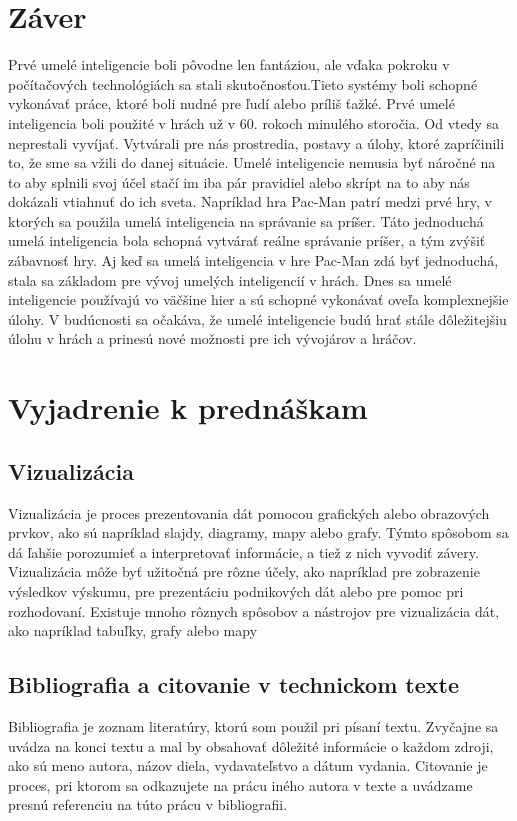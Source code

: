 \documentclass[10pt,oneside,slovak,a4paper]{article}
\begin{document}
\section{Záver}
Prvé umelé inteligencie boli pôvodne len fantáziou, ale vďaka pokroku v počítačových technológiách sa stali skutočnosťou.Tieto systémy boli schopné vykonávať práce, ktoré boli nudné pre ľudí alebo príliš ťažké.
Prvé umelé inteligencia boli použité v hrách už v 60. rokoch minulého storočia. Od vtedy sa neprestali vyvíjať. Vytvárali pre nás prostredia, postavy a úlohy, ktoré zapríčinili to, že sme sa vžili do danej situácie. Umelé inteligencie nemusia byť náročné na to aby splnili svoj účel stačí im iba pár pravidiel alebo skrípt na to aby nás dokázali vtiahnuť do ich sveta.
Napríklad hra Pac-Man patrí medzi prvé hry, v ktorých sa použila umelá inteligencia na správanie sa príšer. Táto jednoduchá umelá inteligencia bola schopná vytvárať reálne správanie príšer, a tým zvýšiť zábavnosť hry. Aj keď sa umelá inteligencia v hre Pac-Man zdá byť jednoduchá, stala sa základom pre vývoj umelých inteligencií v hrách. Dnes sa umelé inteligencie používajú vo väčšine hier a sú schopné vykonávať oveľa komplexnejšie úlohy. V budúcnosti sa očakáva, že umelé inteligencie budú hrať stále dôležitejšiu úlohu v hrách a prinesú nové možnosti pre ich vývojárov a hráčov.

\section{Vyjadrenie k prednáškam}
\subsection{Vizualizácia }
Vizualizácia je proces prezentovania dát pomocou grafických alebo obrazových prvkov, ako sú napríklad slajdy, diagramy, mapy alebo grafy. Týmto spôsobom sa dá ľahšie porozumieť a interpretovať informácie, a tiež z nich vyvodiť závery. Vizualizácia môže byť užitočná pre rôzne účely, ako napríklad pre zobrazenie výsledkov výskumu, pre prezentáciu podnikových dát alebo pre pomoc pri rozhodovaní. Existuje mnoho rôznych spôsobov a nástrojov pre vizualizácia dát, ako napríklad tabuľky, grafy alebo mapy 
\subsection{Bibliografia a citovanie v technickom texte}
Bibliografia je zoznam literatúry, ktorú som použil pri písaní textu. Zvyčajne sa uvádza na konci textu a mal by obsahovať dôležité informácie o každom zdroji, ako sú meno autora, názov diela, vydavateľstvo a dátum vydania. Citovanie je proces, pri ktorom sa odkazujete na prácu iného autora v texte a uvádzame presnú referenciu na túto prácu v bibliografii.
\end{document}
